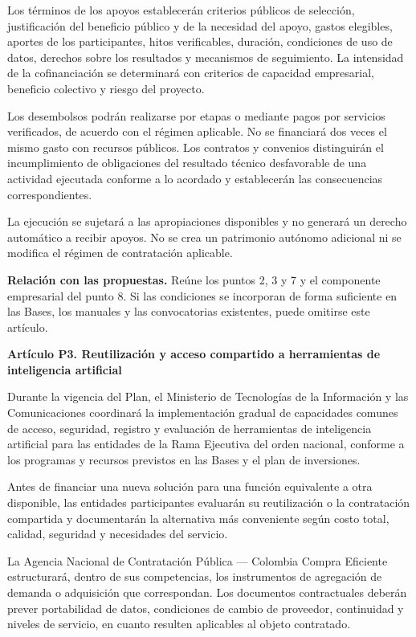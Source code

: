 Los términos de los apoyos establecerán criterios públicos de selección, justificación del beneficio público y de la necesidad del apoyo, gastos elegibles, aportes de los participantes, hitos verificables, duración, condiciones de uso de datos, derechos sobre los resultados y mecanismos de seguimiento. La intensidad de la cofinanciación se determinará con criterios de capacidad empresarial, beneficio colectivo y riesgo del proyecto.

Los desembolsos podrán realizarse por etapas o mediante pagos por servicios verificados, de acuerdo con el régimen aplicable. No se financiará dos veces el mismo gasto con recursos públicos. Los contratos y convenios distinguirán el incumplimiento de obligaciones del resultado técnico desfavorable de una actividad ejecutada conforme a lo acordado y establecerán las consecuencias correspondientes.

La ejecución se sujetará a las apropiaciones disponibles y no generará un derecho automático a recibir apoyos. No se crea un patrimonio autónomo adicional ni se modifica el régimen de contratación aplicable.

\textbf{Relación con las propuestas.} Reúne los puntos 2, 3 y 7 y el componente empresarial del punto 8. Si las condiciones se incorporan de forma suficiente en las Bases, los manuales y las convocatorias existentes, puede omitirse este artículo.

\textbf{Artículo P3. Reutilización y acceso compartido a herramientas de inteligencia artificial}\par\nobreak

Durante la vigencia del Plan, el Ministerio de Tecnologías de la Información y las Comunicaciones coordinará la implementación gradual de capacidades comunes de acceso, seguridad, registro y evaluación de herramientas de inteligencia artificial para las entidades de la Rama Ejecutiva del orden nacional, conforme a los programas y recursos previstos en las Bases y el plan de inversiones.

Antes de financiar una nueva solución para una función equivalente a otra disponible, las entidades participantes evaluarán su reutilización o la contratación compartida y documentarán la alternativa más conveniente según costo total, calidad, seguridad y necesidades del servicio.

La Agencia Nacional de Contratación Pública — Colombia Compra Eficiente estructurará, dentro de sus competencias, los instrumentos de agregación de demanda o adquisición que correspondan. Los documentos contractuales deberán prever portabilidad de datos, condiciones de cambio de proveedor, continuidad y niveles de servicio, en cuanto resulten aplicables al objeto contratado.

